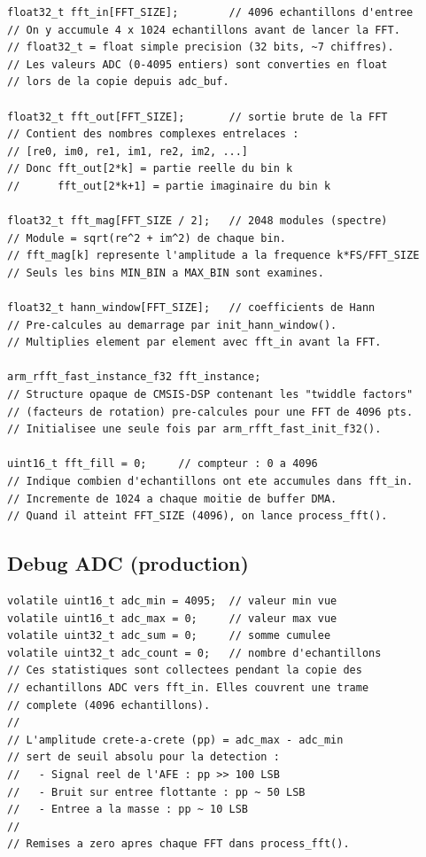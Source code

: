 \documentclass[a4paper,11pt]{article}
\begin{document}
\begin{lstlisting}[style=cstyle,caption={Buffers et \'etat de la FFT}]
float32_t fft_in[FFT_SIZE];        // 4096 echantillons d'entree
// On y accumule 4 x 1024 echantillons avant de lancer la FFT.
// float32_t = float simple precision (32 bits, ~7 chiffres).
// Les valeurs ADC (0-4095 entiers) sont converties en float
// lors de la copie depuis adc_buf.

float32_t fft_out[FFT_SIZE];       // sortie brute de la FFT
// Contient des nombres complexes entrelaces :
// [re0, im0, re1, im1, re2, im2, ...]
// Donc fft_out[2*k] = partie reelle du bin k
//      fft_out[2*k+1] = partie imaginaire du bin k

float32_t fft_mag[FFT_SIZE / 2];   // 2048 modules (spectre)
// Module = sqrt(re^2 + im^2) de chaque bin.
// fft_mag[k] represente l'amplitude a la frequence k*FS/FFT_SIZE
// Seuls les bins MIN_BIN a MAX_BIN sont examines.

float32_t hann_window[FFT_SIZE];   // coefficients de Hann
// Pre-calcules au demarrage par init_hann_window().
// Multiplies element par element avec fft_in avant la FFT.

arm_rfft_fast_instance_f32 fft_instance;
// Structure opaque de CMSIS-DSP contenant les "twiddle factors"
// (facteurs de rotation) pre-calcules pour une FFT de 4096 pts.
// Initialisee une seule fois par arm_rfft_fast_init_f32().

uint16_t fft_fill = 0;     // compteur : 0 a 4096
// Indique combien d'echantillons ont ete accumules dans fft_in.
// Incremente de 1024 a chaque moitie de buffer DMA.
// Quand il atteint FFT_SIZE (4096), on lance process_fft().
\end{lstlisting}

\subsection{Debug ADC (production)}

\begin{lstlisting}[style=cstyle,caption={Variables de diagnostic ADC}]
volatile uint16_t adc_min = 4095;  // valeur min vue
volatile uint16_t adc_max = 0;     // valeur max vue
volatile uint32_t adc_sum = 0;     // somme cumulee
volatile uint32_t adc_count = 0;   // nombre d'echantillons
// Ces statistiques sont collectees pendant la copie des
// echantillons ADC vers fft_in. Elles couvrent une trame
// complete (4096 echantillons).
//
// L'amplitude crete-a-crete (pp) = adc_max - adc_min
// sert de seuil absolu pour la detection :
//   - Signal reel de l'AFE : pp >> 100 LSB
//   - Bruit sur entree flottante : pp ~ 50 LSB
//   - Entree a la masse : pp ~ 10 LSB
//
// Remises a zero apres chaque FFT dans process_fft().
\end{lstlisting}
\end{document}
